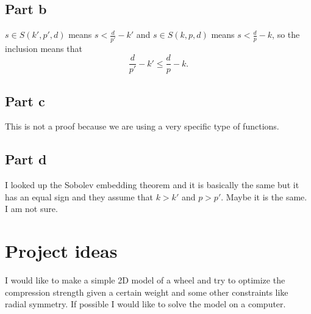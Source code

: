 \documentclass{article}
\begin{document}
\subsection*{Part b}
$s\in S(k',p',d)$ means $s<\frac{d}{p'}-k'$ and $s\in S(k,p,d)$ means
$s<\frac{d}{p}-k$, so the inclusion means that
\[
	\frac{d}{p'}-k' \leq \frac{d}{p}-k.
\]
\subsection*{Part c}
This is not a proof because we are using a very specific type of functions.
\subsection*{Part d}
I looked up the Sobolev embedding theorem and it is basically the same but it has an equal sign and they assume that $k > k'$ and $p > p'$. Maybe it is the same. I am not sure.
\section*{Project ideas}
I would like to make a simple 2D model of a wheel and try to optimize the
compression strength given a certain weight and some other constraints like
radial symmetry. If possible I would like to solve the model on a computer.
\end{document}
